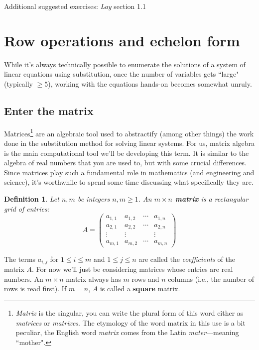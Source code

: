 \documentclass[12pt]{article}
\numberwithin{equation}{subsection}
\numberwithin{figure}{subsection}
\newtheorem{defn}[subsection]{Definition}
\theoremstyle{note}
\begin{document}
Additional suggested exercises: \textit{Lay} section 1.1

\section{Row operations and echelon form}


While it's always technically possible to enumerate the solutions of a system of linear equations using substitution, once the number of variables gets ``large" (typically $\geq 5$), working with the equations hands-on becomes somewhat unruly. 

\subsection{Enter the matrix}
{Matrices}\footnote{\textit{Matrix} is the singular, you can write the plural form of this word either as \textit{matrices} or \textit{matrixes}. The etymology of the word matrix in this use is a bit peculiar, the English word \textit{matrix} comes from the Latin \textit{mater}---meaning ``mother".} are an algebraic tool used to abstractify (among other things) the work done in the substitution method for solving linear systems. For us, matrix algebra is the main computational tool we'll be developing this term. It is similar to the algebra of real numbers that you are used to, but with some crucial differences. Since matrices play such a fundamental role in mathematics (and engineering and science), it's worthwhile to spend some time discussing what specifically they are. 

\begin{defn}
Let $n,m$ be integers $n,m \geq 1$. An \textbf{$m\times n$ matrix} is a rectangular grid of entries: \begin{equation} A=\begin{pmatrix} a_{1,1} & a_{1,2} & \cdots & a_{1,n} \\
a_{2,1} & a_{2,2} & \cdots & a_{2,n} \\
\vdots & \vdots & & \vdots \\
a_{m,1} & a_{m,2} &\cdots & a_{m,n}
\end{pmatrix} \end{equation}
\end{defn}
The terms $a_{i,j}$ for $1\leq i\leq m$ and $1\leq j\leq n$ are called the \textit{coefficients} of the matrix $A$. For now we'll just be considering matrices whose entries are real numbers. An $m\times n$ matrix always has $m$ rows and $n$ columns (i.e., the number of rows is read first). If $m=n$, $A$ is called a \textbf{square} matrix. 
\end{document}
